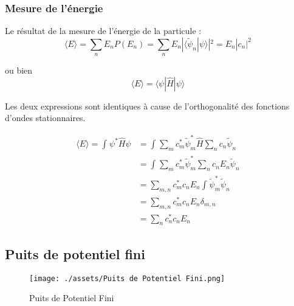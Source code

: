 \subsubsection{Mesure de l'énergie} %
\label{sec:Mesure de l'énergie}

Le résultat de la mesure de l'énergie de la particule : \begin{equation}
\langle E \rangle  = \sum_{n}^{} E_n P(E_n) = \sum_{n}^{} E_n | \langle \widetilde \psi_n | \psi \rangle| ^{2} = E_n | c_n| ^{2}
\end{equation}

ou bien 
\begin{equation}
  \langle E \rangle = \langle \psi | \hat{H} | \psi \rangle
\end{equation}

\begin{myproof}{}{}
Les deux expressions sont identiques à cause de l'orthogonalité des fonctions d'ondes stationnaires.

\begin{align}
  \langle E \rangle = \int_{}^{} \psi ^{*} \hat{H} \psi &= \int_{}^{} \sum_{m}^{} c_m ^{*} \widetilde \psi_m ^{*} \hat{H} \sum_{n}^{} c_n \widetilde \psi_n \\ 
                                                        &= \int_{}^{} \sum_{m}^{} c_m ^{*} \widetilde \psi_m ^{*} \sum_{n}^{} c_n E_n \widetilde \psi_n \\
                                                        &= \sum_{m,n}^{} c_m ^{*} c_n E_n \int_{}^{} \widetilde \psi_m ^{*} \widetilde\psi_n \\ 
                                                        &= \sum_{m,n}^{} c_m ^{*} c_n E_n \delta _{m,n} \\
                                                        &= \sum_{n}^{} c_n ^{*} c_n E_n
\end{align}
\end{myproof}




\subsection{Puits de potentiel fini} %
\label{sub:Puits de potentiel fini}

\begin{figure}[H] %
  \centering
  \texttt{[image: ./assets/Puits de Potentiel Fini.png]}
  \caption{Puits de Potentiel Fini}
  \label{fig:Puits de Potentiel Fini}
\end{figure}





